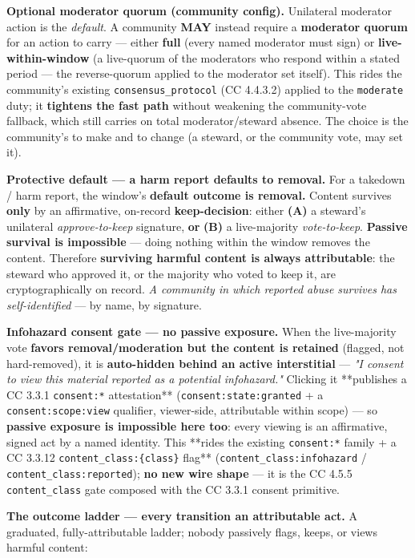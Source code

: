 \documentclass[11pt]{article}
\begin{document}
\textbf{Optional moderator quorum (community config).} Unilateral moderator action is the \textit{default}. A community \textbf{MAY} instead require a \textbf{moderator quorum} for an action to carry — either \textbf{full} (every named moderator must sign) or \textbf{live-within-window} (a live-quorum of the moderators who respond within a stated period — the reverse-quorum applied to the moderator set itself). This rides the community's existing \texttt{consensus\_protocol} (CC 4.4.3.2) applied to the \texttt{moderate} duty; it \textbf{tightens the fast path} without weakening the community-vote fallback, which still carries on total moderator/steward absence. The choice is the community's to make and to change (a steward, or the community vote, may set it).


\textbf{Protective default — a harm report defaults to removal.} For a takedown / harm report, the window's \textbf{default outcome is removal.} Content survives \textbf{only} by an affirmative, on-record \textbf{keep-decision}: either \textbf{(A)} a steward's unilateral \textit{approve-to-keep} signature, \textbf{or} \textbf{(B)} a live-majority \textit{vote-to-keep}. \textbf{Passive survival is impossible} — doing nothing within the window removes the content. Therefore \textbf{surviving harmful content is always attributable}: the steward who approved it, or the majority who voted to keep it, are cryptographically on record. \textit{A community in which reported abuse survives has self-identified} — by name, by signature.


\textbf{Infohazard consent gate — no passive exposure.} When the live-majority vote \textbf{favors removal/moderation but the content is retained} (flagged, not hard-removed), it is \textbf{auto-hidden behind an active interstitial} — \textit{"I consent to view this material reported as a potential infohazard."} Clicking it **publishes a CC 3.3.1 \texttt{consent:*} attestation** (\texttt{consent:state:granted} + a \texttt{consent:scope:view} qualifier, viewer-side, attributable within scope) — so \textbf{passive exposure is impossible here too}: every viewing is an affirmative, signed act by a named identity. This **rides the existing \texttt{consent:*} family + a CC 3.3.12 \texttt{content\_class:\{class\}} flag** (\texttt{content\_class:infohazard} / \texttt{content\_class:reported}); \textbf{no new wire shape} — it is the CC 4.5.5 \texttt{content\_class} gate composed with the CC 3.3.1 consent primitive.


\textbf{The outcome ladder — every transition an attributable act.} A graduated, fully-attributable ladder; nobody passively flags, keeps, or views harmful content:
\end{document}
